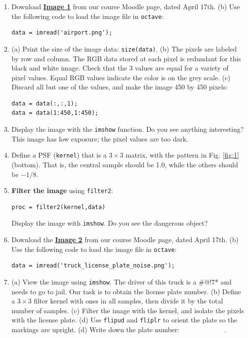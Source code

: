\documentclass{article}
\begin{document}
\begin{enumerate}
\item Download \textbf{\href{https://cms.whittier.edu/mod/resource/view.php?id=682787}{Image 1}} from our course Moodle page, dated April 17th. (b) Use the following code to load the image file in \verb+octave+:
\begin{verbatim}
data = imread('airport.png');
\end{verbatim}
\item (a) Print the size of the image data: \verb+size(data)+. (b) The pixels are labeled by row and column.  The RGB data stored at each pixel is redundant for this black and white image.  Check that the 3 values are equal for a variety of pixel values.  Equal RGB values indicate the color is on the grey scale.  (c) Discard all but one of the values, and make the image 450 by 450 pixels:
\begin{verbatim}
data = data(:,:,1);
data = data(1:450,1:450);
\end{verbatim}
\item Display the image with the \verb+imshow+ function.  Do you see anything interesting?  This image has low exposure; the pixel values are too dark.
\item Define a PSF (\verb+kernel+) that is a $3\times 3$ matrix, with the pattern in Fig. \ref{fig:1} (bottom).  That is, the central sample should be 1.0, while the others should be $-1/8$.
\item \textbf{Filter the image} using \verb+filter2+:
\begin{verbatim}
proc = filter2(kernel,data)
\end{verbatim}
Display the image with \verb+imshow+. Do you see the dangerous object?
\item Download the \textbf{\href{https://cms.whittier.edu/mod/resource/view.php?id=682804}{Image 2}} from our course Moodle page, dated April 17th. (b) Use the following code to load the image file in \verb+octave+:
\begin{verbatim}
data = imread('truck_license_plate_noise.png');
\end{verbatim}
\item (a) View the image using \verb+imshow+.  The driver of this truck is a \#@!7* and needs to go to jail.  Our task is to obtain the license plate number. (b) Define a $3\times 3$ filter kernel with ones in all samples, then divide it by the total number of samples. (c) Filter the image with the kernel, and isolate the pixels with the license plate. (d) Use \verb+flipud+ and \verb+fliplr+ to orient the plate so the markings are upright. (d) Write down the plate number:\underline{$~~~~~~~~~~~~~~~~~~~~~~~~~~~~~~$}.
\end{enumerate}
\end{document}
